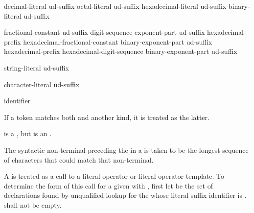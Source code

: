 \begin{bnf}
\br
    decimal-literal ud-suffix\br
    octal-literal ud-suffix\br
    hexadecimal-literal ud-suffix\br
    binary-literal ud-suffix
\end{bnf}

\begin{bnf}
\br
    fractional-constant  ud-suffix\br
    digit-sequence exponent-part ud-suffix\br
    hexadecimal-prefix hexadecimal-fractional-constant binary-exponent-part ud-suffix\br
    hexadecimal-prefix hexadecimal-digit-sequence binary-exponent-part ud-suffix
\end{bnf}

\begin{bnf}
\br
    string-literal ud-suffix
\end{bnf}

\begin{bnf}
\br
    character-literal ud-suffix
\end{bnf}

\begin{bnf}
\br
    identifier
\end{bnf}

\pnum
If a token matches both  and another  kind, it
is treated as the latter.
\begin{example}
is a , but  is an
.
\end{example}
The syntactic non-terminal preceding the  in a
 is taken to be the longest sequence of
characters that could match that non-terminal.

\pnum
A  is treated as a call to a literal operator or
literal operator template.
To determine the form of this call for
a given  
with  ,
first let  be the set of declarations
found by unqualified lookup for the 
whose literal suffix identifier is .
 shall not be empty.

